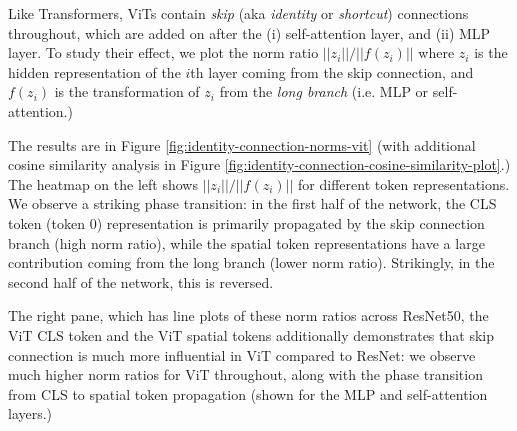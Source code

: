 \documentclass{article}
\begin{document}
Like Transformers, ViTs contain \textit{skip} (aka \textit{identity} or \textit{shortcut}) connections throughout, which are added on after the (i) self-attention layer, and (ii) MLP layer. To study their effect, we plot the norm ratio $||z_i||/||f(z_i)||$ where $z_i$ is the hidden representation of the $i$th layer coming from the skip connection, and $f(z_i)$ is the transformation of $z_i$ from the \textit{long branch} (i.e.  MLP or self-attention.) 

The results are in Figure \ref{fig:identity-connection-norms-vit} (with additional cosine similarity analysis in Figure \ref{fig:identity-connection-cosine-similarity-plot}.) The heatmap on the left shows $||z_i||/||f(z_i)||$ for different token representations. We observe a striking phase transition: in the first half of the network, the CLS token (token 0) representation is primarily propagated by the skip connection branch (high norm ratio), while the spatial token representations have a large contribution coming from the long branch (lower norm ratio). Strikingly, in the second half of the network, this is reversed. 

The right pane, which has line plots of these norm ratios across ResNet50, the ViT CLS token and the ViT spatial tokens additionally demonstrates that skip connection is much more influential in ViT compared to ResNet: we observe much higher norm ratios for ViT throughout, along with the phase transition from CLS to spatial token propagation (shown for the MLP and self-attention layers.)
\end{document}
